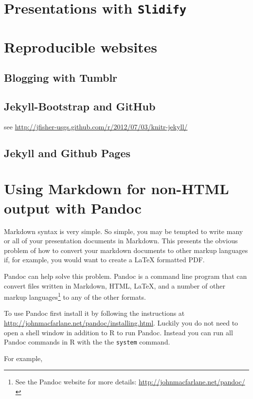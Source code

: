 \section{Presentations with \texttt{Slidify}}

\section{Reproducible websites}

\subsection{Blogging with Tumblr}

\subsection{Jekyll-Bootstrap and GitHub}

see \url{http://jfisher-usgs.github.com/r/2012/07/03/knitr-jekyll/}

\subsection{Jekyll and Github Pages}

\section{Using Markdown for non-HTML output with Pandoc}

Markdown syntax is very simple. So simple, you may be tempted to write many or all of your presentation documents in Markdown. This presents the obvious problem of how to convert your markdown documents to other markup languages if, for example, you would want to create a LaTeX formatted PDF. 

Pandoc can help solve this problem. Pandoc is a command line program that can convert files written in Markdown, HTML, LaTeX, and a number of other markup languages\footnote{See the Pandoc website for more details: \url{http://johnmacfarlane.net/pandoc/}} to any of the other formats. 

To use Pandoc first install it by following the instructions at {\url{http://johnmacfarlane.net/pandoc/installing.html}}. Luckily you do not need to open a shell window in addition to R to run Pandoc. Instead you can run all Pandoc commands in R with the the {\tt{system}} command. 

For example, 


  
